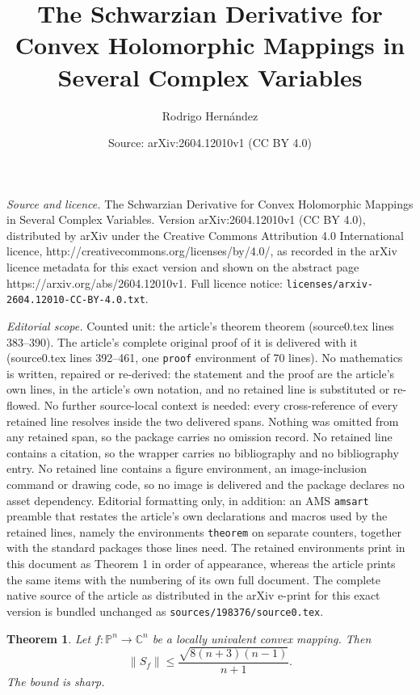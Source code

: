 \documentclass[10pt,a4paper]{amsart}
\title{The Schwarzian Derivative for Convex Holomorphic Mappings in Several Complex Variables}
\author{Rodrigo Hern\'andez}
\date{Source: arXiv:2604.12010v1 (CC BY 4.0)}
\newtheorem{theorem}{Theorem}
\begin{document}
\maketitle

\noindent\emph{Source and licence.} The Schwarzian Derivative for Convex Holomorphic Mappings in Several Complex Variables. Version arXiv:2604.12010v1 (CC BY 4.0), distributed by arXiv under the Creative Commons Attribution 4.0 International licence, http://creativecommons.org/licenses/by/4.0/, as recorded in the arXiv licence metadata for this exact version and shown on the abstract page https://arxiv.org/abs/2604.12010v1. Full licence notice: \texttt{licenses/arxiv-2604.12010-CC-BY-4.0.txt}.\par\smallskip

\noindent\textit{Editorial scope.} Counted unit: the article's theorem theorem (source0.tex lines 383--390). The article's complete original proof of it is delivered with it (source0.tex lines 392--461, one \texttt{proof} environment of 70 lines). No mathematics is written, repaired or re-derived: the statement and the proof are the article's own lines, in the article's own notation, and no retained line is substituted or re-flowed.  No further source-local context is needed: every cross-reference of every retained line resolves inside the two delivered spans.  Nothing was omitted from any retained span, so the package carries no omission record.  No retained line contains a citation, so the wrapper carries no bibliography and no bibliography entry.  No retained line contains a figure environment, an image-inclusion command or drawing code, so no image is delivered and the package declares no asset dependency.  Editorial formatting only, in addition: an AMS \texttt{amsart} preamble that restates the article's own declarations and macros used by the retained lines, namely the environments \texttt{theorem} on separate counters, together with the standard packages those lines need.  The retained environments print in this document as Theorem 1 in order of appearance, whereas the article prints the same items with the numbering of its own full document.  The complete native source of the article as distributed in the arXiv e-print for this exact version is bundled unchanged as \texttt{sources/198376/source0.tex}.
\begin{theorem}
Let $f:\mathbb{P}^n\to\mathbb{C}^n$ be a locally univalent convex mapping.
Then
\[
\|S_f\|\leq \frac{\sqrt{8(n+3)(n-1)}}{n+1}.
\]
The bound is sharp.
\end{theorem}
\end{document}
